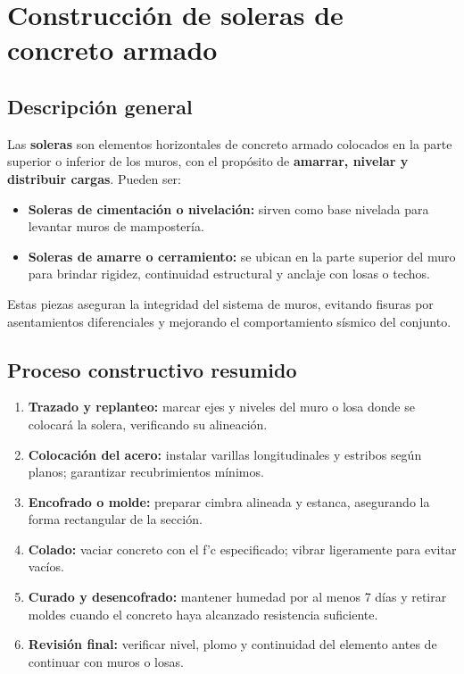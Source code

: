 \documentclass[12pt]{article}
\begin{document}
	
	
	
	
	
	
	
	
	
	
	
	
	
	
	\section{Construcción de soleras de concreto armado}
	
	\subsection*{Descripción general}
	Las \textbf{soleras} son elementos horizontales de concreto armado colocados en la parte superior o inferior de los muros, con el propósito de \textbf{amarrar, nivelar y distribuir cargas}.  
	Pueden ser:
	\begin{itemize}[leftmargin=*, itemsep=0pt]
		\item \textbf{Soleras de cimentación o nivelación:} sirven como base nivelada para levantar muros de mampostería.  
		\item \textbf{Soleras de amarre o cerramiento:} se ubican en la parte superior del muro para brindar rigidez, continuidad estructural y anclaje con losas o techos.
	\end{itemize}
	Estas piezas aseguran la integridad del sistema de muros, evitando fisuras por asentamientos diferenciales y mejorando el comportamiento sísmico del conjunto.
	
	\subsection*{Proceso constructivo resumido}
	\begin{enumerate}[leftmargin=*, itemsep=2pt]
		\item \textbf{Trazado y replanteo:} marcar ejes y niveles del muro o losa donde se colocará la solera, verificando su alineación.
		\item \textbf{Colocación del acero:} instalar varillas longitudinales y estribos según planos; garantizar recubrimientos mínimos.
		\item \textbf{Encofrado o molde:} preparar cimbra alineada y estanca, asegurando la forma rectangular de la sección.
		\item \textbf{Colado:} vaciar concreto con el f’c especificado; vibrar ligeramente para evitar vacíos.
		\item \textbf{Curado y desencofrado:} mantener humedad por al menos 7 días y retirar moldes cuando el concreto haya alcanzado resistencia suficiente.
		\item \textbf{Revisión final:} verificar nivel, plomo y continuidad del elemento antes de continuar con muros o losas.
	\end{enumerate}
	
\end{document}
